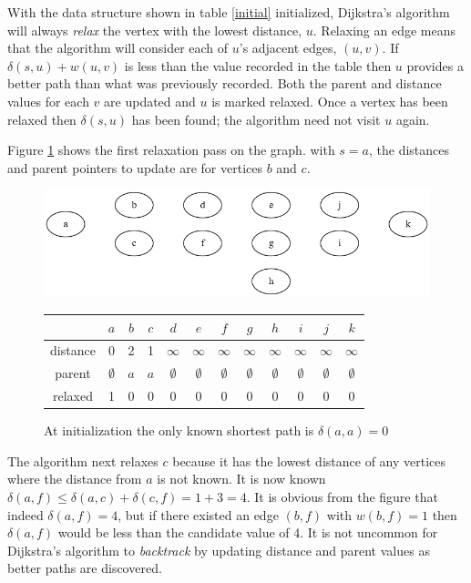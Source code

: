 \documentclass{book}
\begin{document}
With the data structure shown in table \ref{initial} initialized, Dijkstra's algorithm will always \textit{relax} the vertex with the lowest distance, $u$. Relaxing an edge means that the algorithm will consider each of $u$'s adjacent edges, $(u,v)$. If $\delta(s, u) + w(u,v)$ is less than the value recorded in the table then $u$ provides a better path than what was previously recorded. Both the parent and distance values for each $v$ are updated and $u$ is marked relaxed. Once a vertex has been relaxed then $\delta(s,u)$ has been found; the algorithm need not visit $u$ again.

Figure \ref{spf1} shows the first relaxation pass on the graph. with $s=a$, the distances and parent pointers to update are for vertices $b$ and $c$.

\begin{figure}[H]
\centering
\includegraphics[width=.75\textwidth]{ch-dijkstra/spf1}
  \begin{tabular}{ | c | c | c | c | c | c | c | c | c | c | c | c | }
  \hline
   & $a$ & $b$ & $c$ & $d$ & $e$ & $f$ & $g$ & $h$ & $i$ & $j$ & $k$ \\
   \hline
   distance & 0 & 2 & 1 & $\infty$ & $\infty$ & $\infty$ & $\infty$ & $\infty$ & $\infty$ & $\infty$ & $\infty$ \\
   \hline
   parent & $\emptyset$ & $a$ & $a$ & $\emptyset$ & $\emptyset$ & $\emptyset$ & $\emptyset$ & $\emptyset$ & $\emptyset$ & $\emptyset$ & $\emptyset$ \\
   \hline
   relaxed & 1 & 0 & 0 & 0 & 0 & 0 & 0 & 0 & 0 & 0 & 0 \\
   \hline
  \end{tabular}
\caption{At initialization the only known shortest path is $\delta(a,a)=0$}
\label{spf1}
\end{figure}

The algorithm next relaxes $c$ because it has the lowest distance of any vertices where the distance from $a$ is not known. It is now known $\delta(a,f) \le \delta(a,c) + \delta(c,f) = 1 + 3 = 4$. It is obvious from the figure that indeed $\delta(a,f) = 4$, but if there existed an edge $(b,f)$ with $w(b,f)=1$ then $\delta(a,f)$ would be less than the candidate value of 4. It is not uncommon for Dijkstra's algorithm to \textit{backtrack} by updating distance and parent values as better paths are discovered.
\end{document}
